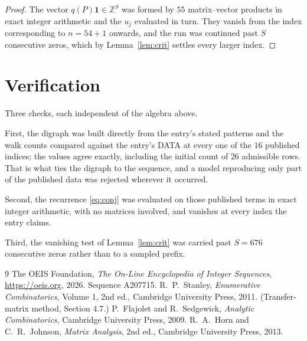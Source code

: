 \documentclass[11pt,a4paper]{article}
\theoremstyle{plain}
\theoremstyle{definition}
\begin{document}
\begin{proof}
The vector $q(P)\mathbf{1}\in\mathbb{Z}^{S}$ was formed by $55$ matrix--vector
products in exact integer arithmetic and the $u_j$ evaluated in turn. They vanish from the
index corresponding to $n=54+1$ onwards, and the run was continued past $S$ consecutive
zeros, which by Lemma~\ref{lem:crit} settles every larger index.
\end{proof}

\section{Verification}

Three checks, each independent of the algebra above.

First, the digraph was built directly from the entry's stated patterns and the walk counts
compared against the entry's DATA at every one of the $16$ published indices; the
values agree exactly, including the initial count of $26$ admissible rows. That is
what ties the digraph to the sequence, and a model reproducing only part of the published
data was rejected wherever it occurred.

Second, the recurrence \eqref{eq:conj} was evaluated on those published terms in exact
integer arithmetic, with no matrices involved, and vanishes at every index the entry claims.

Third, the vanishing test of Lemma~\ref{lem:crit} was carried past $S=676$ consecutive
zeros rather than to a sampled prefix.

\begin{thebibliography}{9}
 The OEIS Foundation, \emph{The On-Line Encyclopedia of Integer
Sequences}, \url{https://oeis.org}, 2026. Sequence A207715.
 R.~P.~Stanley, \emph{Enumerative Combinatorics}, Volume 1, 2nd ed.,
Cambridge University Press, 2011. (Transfer-matrix method, Section 4.7.)
 P.~Flajolet and R.~Sedgewick, \emph{Analytic Combinatorics}, Cambridge
University Press, 2009.
 R.~A.~Horn and C.~R.~Johnson, \emph{Matrix Analysis}, 2nd ed., Cambridge
University Press, 2013.
\end{thebibliography}
\end{document}
